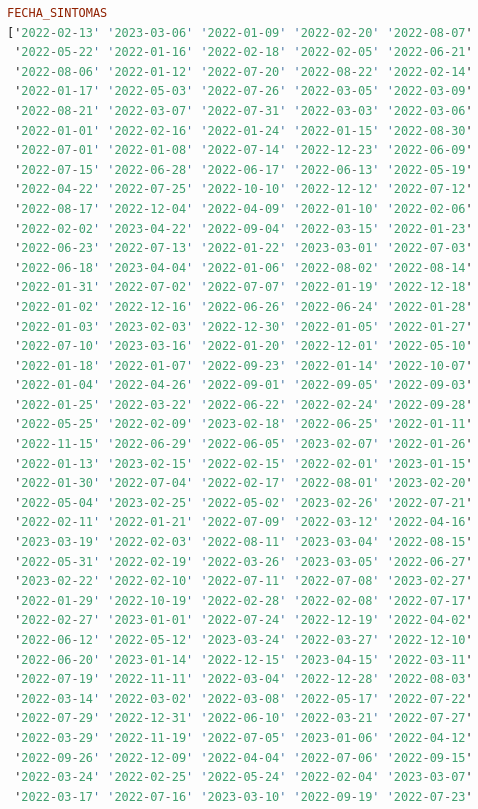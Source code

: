 \begin{lstlisting}[language=haskell, caption=Valores por columna, captionpos=b, label=lst:fiboHaskell]
FECHA_SINTOMAS
['2022-02-13' '2023-03-06' '2022-01-09' '2022-02-20' '2022-08-07'
 '2022-05-22' '2022-01-16' '2022-02-18' '2022-02-05' '2022-06-21'
 '2022-08-06' '2022-01-12' '2022-07-20' '2022-08-22' '2022-02-14'
 '2022-01-17' '2022-05-03' '2022-07-26' '2022-03-05' '2022-03-09'
 '2022-08-21' '2022-03-07' '2022-07-31' '2022-03-03' '2022-03-06'
 '2022-01-01' '2022-02-16' '2022-01-24' '2022-01-15' '2022-08-30'
 '2022-07-01' '2022-01-08' '2022-07-14' '2022-12-23' '2022-06-09'
 '2022-07-15' '2022-06-28' '2022-06-17' '2022-06-13' '2022-05-19'
 '2022-04-22' '2022-07-25' '2022-10-10' '2022-12-12' '2022-07-12'
 '2022-08-17' '2022-12-04' '2022-04-09' '2022-01-10' '2022-02-06'
 '2022-02-02' '2023-04-22' '2022-09-04' '2022-03-15' '2022-01-23'
 '2022-06-23' '2022-07-13' '2022-01-22' '2023-03-01' '2022-07-03'
 '2022-06-18' '2023-04-04' '2022-01-06' '2022-08-02' '2022-08-14'
 '2022-01-31' '2022-07-02' '2022-07-07' '2022-01-19' '2022-12-18'
 '2022-01-02' '2022-12-16' '2022-06-26' '2022-06-24' '2022-01-28'
 '2022-01-03' '2023-02-03' '2022-12-30' '2022-01-05' '2022-01-27'
 '2022-07-10' '2023-03-16' '2022-01-20' '2022-12-01' '2022-05-10'
 '2022-01-18' '2022-01-07' '2022-09-23' '2022-01-14' '2022-10-07'
 '2022-01-04' '2022-04-26' '2022-09-01' '2022-09-05' '2022-09-03'
 '2022-01-25' '2022-03-22' '2022-06-22' '2022-02-24' '2022-09-28'
 '2022-05-25' '2022-02-09' '2023-02-18' '2022-06-25' '2022-01-11'
 '2022-11-15' '2022-06-29' '2022-06-05' '2023-02-07' '2022-01-26'
 '2022-01-13' '2023-02-15' '2022-02-15' '2022-02-01' '2023-01-15'
 '2022-01-30' '2022-07-04' '2022-02-17' '2022-08-01' '2023-02-20'
 '2022-05-04' '2023-02-25' '2022-05-02' '2023-02-26' '2022-07-21'
 '2022-02-11' '2022-01-21' '2022-07-09' '2022-03-12' '2022-04-16'
 '2023-03-19' '2022-02-03' '2022-08-11' '2023-03-04' '2022-08-15'
 '2022-05-31' '2022-02-19' '2022-03-26' '2023-03-05' '2022-06-27'
 '2023-02-22' '2022-02-10' '2022-07-11' '2022-07-08' '2023-02-27'
 '2022-01-29' '2022-10-19' '2022-02-28' '2022-02-08' '2022-07-17'
 '2022-02-27' '2023-01-01' '2022-07-24' '2022-12-19' '2022-04-02'
 '2022-06-12' '2022-05-12' '2023-03-24' '2022-03-27' '2022-12-10'
 '2022-06-20' '2023-01-14' '2022-12-15' '2023-04-15' '2022-03-11'
 '2022-07-19' '2022-11-11' '2022-03-04' '2022-12-28' '2022-08-03'
 '2022-03-14' '2022-03-02' '2022-03-08' '2022-05-17' '2022-07-22'
 '2022-07-29' '2022-12-31' '2022-06-10' '2022-03-21' '2022-07-27'
 '2022-03-29' '2022-11-19' '2022-07-05' '2023-01-06' '2022-04-12'
 '2022-09-26' '2022-12-09' '2022-04-04' '2022-07-06' '2022-09-15'
 '2022-03-24' '2022-02-25' '2022-05-24' '2022-02-04' '2023-03-07'
 '2022-03-17' '2022-07-16' '2023-03-10' '2022-09-19' '2022-07-23'

\end{lstlisting}

